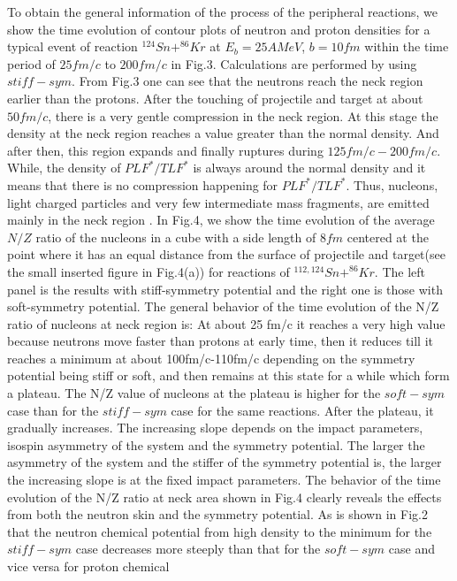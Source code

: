 \documentclass[aps,prc,groupedaddress,showpacs,manuscript]{revtex4}
\begin{document}
To obtain the general information of the process of the peripheral
reactions, we show the time evolution of contour plots of neutron
and proton densities for a typical event of reaction
$^{124}Sn+^{86}Kr$ at $E_{b}=25AMeV$, $b=10fm$ within the time
period of $25fm/c$ to $200fm/c$ in Fig.3. Calculations are
performed by using $stiff-sym$. From Fig.3 one can see that the
neutrons reach the neck region earlier than the protons. After the
touching of projectile and target at about $50fm/c$, there is a
very gentle compression in the neck region. At this stage the
density at the neck region reaches a value greater than the normal
density. And after then, this region expands and finally ruptures
during $125fm/c-200fm/c$. While, the density of $PLF^{*}/TLF^{*}$
is always around the normal density and it means that there is no
compression happening for $PLF^{*}/TLF^{*}$. Thus, nucleons, light
charged particles and very few intermediate mass fragments, are
emitted mainly in the neck region . In Fig.4, we show the time
evolution of the average $N/Z$ ratio of the nucleons in a cube
with a side length of $8fm$ centered at the point where it has an
equal distance from the surface of projectile and target(see the
small inserted figure in Fig.4(a)) for reactions of
$^{112,124}Sn+^{86}Kr$. The left panel is the results with
stiff-symmetry potential and the right one is those with
soft-symmetry potential. The general behavior of the time
evolution of the N/Z ratio of nucleons at neck region is: At about
25 fm/c it reaches a very high value because neutrons move faster
than protons at early time, then it reduces till it reaches a
minimum at about 100fm/c-110fm/c depending on the symmetry
potential being stiff or soft, and then remains at this state for
a while which form a plateau. The N/Z value of nucleons at the
plateau is higher for the $soft-sym$ case than for the $stiff-sym$
case for the same reactions. After the plateau, it gradually
increases. The increasing slope depends on the impact parameters,
isospin asymmetry of the system and the symmetry potential. The
larger the asymmetry of the system and the stiffer of the symmetry
potential is, the larger the increasing slope is at the fixed
impact parameters. The behavior of the time evolution of the N/Z
ratio at neck area shown in Fig.4 clearly reveals the effects from
both the neutron skin and the symmetry potential. As is shown in
Fig.2 that the neutron chemical potential from high density to the
minimum for the $stiff-sym$ case decreases more steeply than that
for the $soft-sym$ case and vice versa for proton chemical
\end{document}
